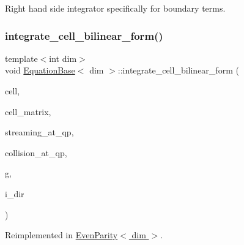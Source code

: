 Right hand side integrator specifically for boundary terms. 

\mbox{\label{class_equation_base_a7421b3c18433975ac794ac22c3af715a}} 
\subsubsection{\texorpdfstring{integrate\+\_\+cell\+\_\+bilinear\+\_\+form()}{integrate\_cell\_bilinear\_form()}}
{\footnotesize\ttfamily template$<$int dim$>$ \\
void \hyperlink{class_equation_base}{Equation\+Base}$<$ dim $>$\+::integrate\+\_\+cell\+\_\+bilinear\+\_\+form (\begin{DoxyParamCaption}\item[{typename Do\+F\+Handler$<$ dim $>$\+::active\+\_\+cell\+\_\+iterator \&}]{cell,  }\item[{Full\+Matrix$<$ double $>$ \&}]{cell\+\_\+matrix,  }\item[{std\+::vector$<$ std\+::vector$<$ Full\+Matrix$<$ double $>$ $>$ $>$ \&}]{streaming\+\_\+at\+\_\+qp,  }\item[{std\+::vector$<$ Full\+Matrix$<$ double $>$ $>$ \&}]{collision\+\_\+at\+\_\+qp,  }\item[{const unsigned int \&}]{g,  }\item[{const unsigned int \&}]{i\+\_\+dir }\end{DoxyParamCaption})\hspace{0.3cm}{\ttfamily [virtual]}}



Reimplemented in \hyperlink{class_even_parity_adb381ea4f45e5ae3741b1d30a0de02b6}{Even\+Parity$<$ dim $>$}.

\mbox{\label{class_equation_base_ae8472f5c20d76c7d01e5660f8377887e}} 
